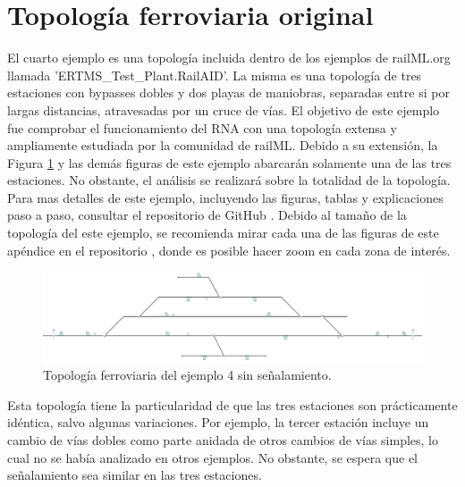 \section{Topología ferroviaria original}
	
	El cuarto ejemplo es una topología incluida dentro de los ejemplos de railML.org llamada 'ERTMS\_Test\_Plant.RailAID'. La misma es una topología de tres estaciones con bypasses dobles y dos playas de maniobras, separadas entre si por largas distancias, atravesadas por un cruce de vías. El objetivo de este ejemplo fue comprobar el funcionamiento del RNA con una topología extensa y ampliamente estudiada por la comunidad de railML. Debido a su extensión, la Figura \ref{fig:EJ4_1} y las demás figuras de este ejemplo abarcarán solamente una de las tres estaciones. No obstante, el análisis se realizará sobre la totalidad de la topología. Para mas detalles de este ejemplo, incluyendo las figuras, tablas y explicaciones paso a paso, consultar el repositorio de GitHub \cite{GITHUB_PHD}. Debido al tamaño de la topología del este ejemplo, se recomienda mirar cada una de las figuras de este apéndice en el repositorio \cite{GITHUB_PHD}, donde es posible hacer zoom en cada zona de interés.
	
	\begin{figure}[h]
		\centering
		\includegraphics[width=1\textwidth]{resultados-obtenidos/ejemplo4/images/4_empty.png}
		\centering\caption{Topología ferroviaria del ejemplo 4 sin señalamiento.}
		\label{fig:EJ4_1}
	\end{figure}
	
	Esta topología tiene la particularidad de que las tres estaciones son prácticamente idéntica, salvo algunas variaciones. Por ejemplo, la tercer estación incluye un cambio de vías dobles como parte anidada de otros cambios de vías simples, lo cual no se había analizado en otros ejemplos. No obstante, se espera que el señalamiento sea similar en las tres estaciones.

